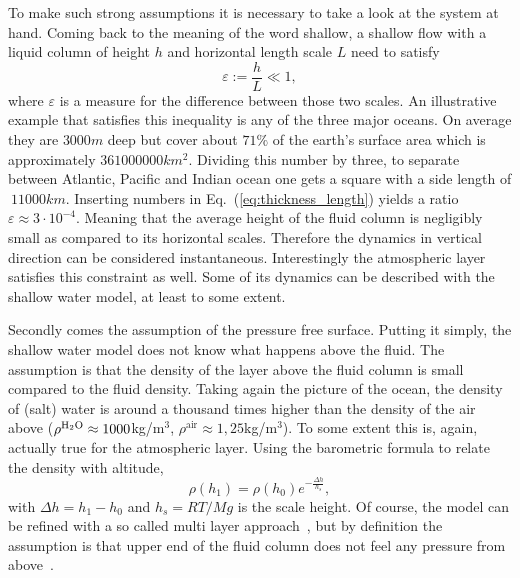 To make such strong assumptions it is necessary to take a look at the system at hand.
Coming back to the meaning of the word shallow, a shallow flow with a liquid column of height $h$ and horizontal length scale $L$ need to satisfy
\begin{equation}\label{eq:thickness_length}
    \varepsilon := \frac{h}{L} \ll 1,
\end{equation}
where $\varepsilon$ is a measure for the difference between those two scales.
An illustrative example that satisfies this inequality is any of the three major oceans.
On average they are $3000m$ deep but cover about $71\%$ of the earth's surface area which is approximately $361000000km^2$.
Dividing this number by three, to separate between Atlantic, Pacific and Indian ocean one gets a square with a side length of $~11000km$.
Inserting numbers in Eq.~(\ref{eq:thickness_length}) yields a ratio $\varepsilon \approx 3\cdot 10^{-4}$.
Meaning that the average height of the fluid column is negligibly small as compared to its horizontal scales.
Therefore the dynamics in vertical direction can be considered instantaneous. 
Interestingly the atmospheric layer satisfies this constraint as well. 
Some of its dynamics can be described with the shallow water model, at least to some extent.

Secondly comes the assumption of the pressure free surface.
Putting it simply, the shallow water model does not know what happens above the fluid.
The assumption is that the density of the layer above the fluid column is small compared to the fluid density.
Taking again the picture of the ocean, the density of (salt) water is around a thousand times higher than the density of the air above ($\rho^{\ce{H2O}} \approx 1000$kg/m$^3$, $\rho^{\text{air}} \approx 1,25$kg/m$^3$).
To some extent this is, again, actually true for the atmospheric layer.
Using the barometric formula to relate the density with altitude,
\begin{equation}\label{eq:bareometric_form}
    \rho(h_1) = \rho(h_0)e^{-\frac{\Delta h}{h_s}},
\end{equation}
with $\Delta h = h_1 - h_0$ and $h_s = RT/Mg$ is the scale height.
Of course, the model can be refined with a so called multi layer approach~\cite{tubbs2009multilayer, prestininzi2013effect}, but by definition the assumption is that upper end of the fluid column does not feel any pressure from above~\cite{tan1992shallow, james2019towards}.

